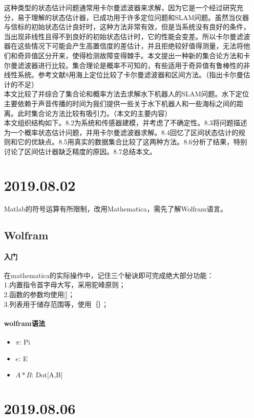 \documentclass[UTF8,a4paper]{ctexart}
\begin{document}
这种类型的状态估计问题通常用卡尔曼滤波器来求解，因为它是一个经过研究充分，易于理解的状态估计器，已成功用于许多定位问题和SLAM问题。虽然当仪器与信标的初始状态估计良好时，这种方法非常有效，但是当系统没有良好的条件，当出现非线性且得不到良好的初始状态估计时，它的性能会变差。所以卡尔曼滤波器在这些情况下可能会产生高置信度的差估计，并且拒绝较好值得测量，无法将他们和奇异值区分开来，使得检测故障变得棘手。本文提出一种新的集合论方法和卡尔曼滤波器进行比较。集合理论是概率不可知的，有些适用于奇异值有鲁棒性的非线性系统。参考文献8用海上定位比较了卡尔曼滤波器和区间方法。（指出卡尔曼估计的不足）\\

本文比较了并综合了集合论和概率方法去求解水下机器人的SLAM问题。水下定位主要依赖于声音传播的时间为我们提供一些关于水下机器人和一些海标之间的距离。此时集合论方法比较有吸引力。（本文的主要内容）\\

本文组织结构如下。8.2为系统和传感器建模，并考虑了不确定性。8.3将问题描述为一个概率状态估计问题，并用卡尔曼滤波器求解。8.4回忆了区间状态估计的规则和它的优缺点。8.5用真实的数据集合比较了这两种方法。8.6分析了结果，特别讨论了区间估计器缺乏精度的原因。8.7总结本文。\\
\section{2019.08.02}
Matlab的符号运算有所限制，改用Mathematica，需先了解Wolfram语言。
\subsection{Wolfram}
\paragraph{入门}在mathematica的实际操作中，记住三个秘诀即可完成绝大部分功能：\\
1.内置指令首字母大写，采用驼峰原则；\\
2.函数的参数均使用[]；\\
3.列表用于储存范围等，使用｛｝；
\paragraph{wolfram语法}
\begin{itemize}
\item $\pi$: Pi
\item $e$: E
\item $A*B$: Dot[A,B]
\end{itemize}
\section{2019.08.06}
\end{document}
